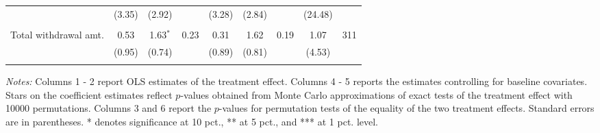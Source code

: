 \begin{table}[htbp]
{\begin{threeparttable}
\begin{tabular}{l*{8}{c}}
          &   (3.35)&   (2.92)&         &   (3.28)&   (2.84)&         &  (24.48)&         \\
          &         &         &         &         &         &         &         &         \\
Total withdrawal amt.&     0.53&1.63$^{*}$&     0.23&     0.31&     1.62&     0.19&     1.07&      311\\
          &   (0.95)&   (0.74)&         &   (0.89)&   (0.81)&         &   (4.53)&         \\
          &         &         &         &         &         &         &         &         \\
\bottomrule \end{tabular} \begin{tablenotes}[flushleft] \footnotesize \item \emph{Notes:} Columns 1 - 2 report OLS estimates of the treatment effect. Columns 4 - 5 reports the estimates controlling for baseline covariates. Stars on the coefficient estimates reflect \(p\)-values obtained from Monte Carlo approximations of exact tests of the treatment effect with 10000 permutations. Columns 3 and 6 report the \(p\)-values for permutation tests of the equality of the two treatment effects. Standard errors are in parentheses. * denotes significance at 10 pct., ** at 5 pct., and *** at 1 pct. level. \end{tablenotes} \end{threeparttable} } \end{table}

